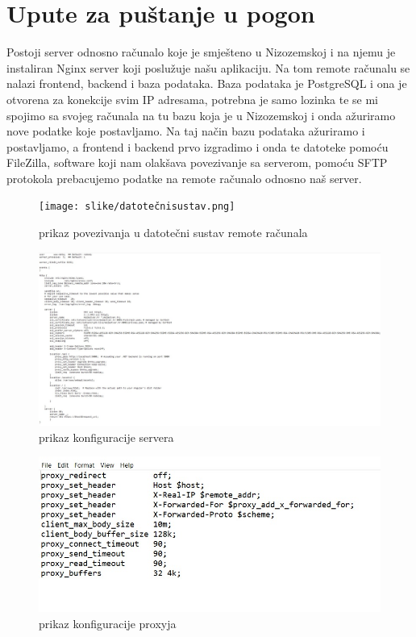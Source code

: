 			\eject 
		
		\section{Upute za puštanje u pogon}
		
			
		
			 {Postoji server odnosno računalo koje je smješteno u Nizozemskoj i na njemu je instaliran Nginx server koji poslužuje našu aplikaciju. Na tom remote računalu se nalazi frontend, backend i baza podataka. Baza podataka je PostgreSQL i ona je otvorena za konekcije svim IP adresama, potrebna je samo lozinka te se mi spojimo sa svojeg računala na tu bazu koja je u Nizozemskoj i onda ažuriramo nove podatke koje postavljamo. Na taj način bazu podataka ažuriramo i postavljamo, a frontend i backend prvo izgradimo i onda te datoteke pomoću FileZilla, software koji nam olakšava povezivanje sa serverom, pomoću SFTP protokola prebacujemo podatke na remote računalo odnosno naš server. }
			 
			 
			 \begin{figure}[hbt!]
			 	\centering
			 	\texttt{[image: slike/datotečnisustav.png]}
			 	\caption{prikaz povezivanja u datotečni sustav remote računala}
			 	\label{fig:datotečnisustav}
			 \end{figure}
			 
			 
			 
			 
			 
			 \begin{figure}[h]
			 	\centering
			 	\includegraphics[width=\textwidth,keepaspectratio]{slike/konfiguracijaservera.png}
			 	\caption{prikaz konfiguracije servera}
			 	\label{fig:konfiguracijaservera}
			 \end{figure}
			 
			 
			 
			 \begin{figure}[hbt!]
			 	\centering
			 	\includegraphics[width=0.7\linewidth]{slike/konfiguracijaproxyja.png}
			 	\caption{prikaz konfiguracije proxyja}
			 	\label{fig:konfiguracijaproxyja}
			 \end{figure}
			 
